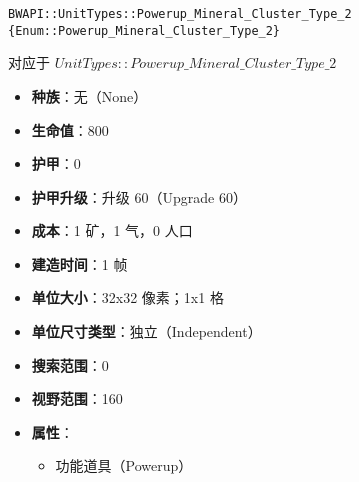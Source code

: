 \begin{tcolorbox}[colback=white, colframe=black!60!white, title=Powerup\_Mineral\_Cluster\_Type\_2(), arc=0mm]
    \begin{verbatim}
BWAPI::UnitTypes::Powerup_Mineral_Cluster_Type_2 {Enum::Powerup_Mineral_Cluster_Type_2}
    \end{verbatim}
    对应于  $UnitTypes::Powerup\_Mineral\_Cluster\_Type\_2$ 
    \begin{itemize}
        \item \textbf{种族}：无（None）
        \item \textbf{生命值}：800
        \item \textbf{护甲}：0
        \item \textbf{护甲升级}：升级 60（Upgrade 60）
        \item \textbf{成本}：1 矿，1 气，0 人口
        \item \textbf{建造时间}：1 帧
        \item \textbf{单位大小}：32x32 像素；1x1 格
        \item \textbf{单位尺寸类型}：独立（Independent）
        \item \textbf{搜索范围}：0
        \item \textbf{视野范围}：160
        \item \textbf{属性}：
            \begin{itemize}
                \item 功能道具（Powerup）
            \end{itemize}
    \end{itemize}
\end{tcolorbox}

